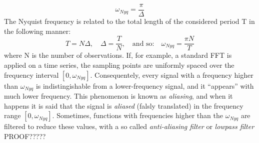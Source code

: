 \documentclass{article}
\begin{document}
\begin{equation}
\omega_{Nyq}=\frac{\pi}{\Delta}
\end{equation}
The Nyquist frequency is related to the total length of the considered period T in the following manner:
\begin{equation}
T=N\Delta, \quad \Delta=\frac{T}{N}, \quad \text{and so:} \quad \omega_{Nyq}=\frac{\pi N}{T}
\end{equation}
where N is the number of observations. If, for example, a standard FFT is applied on a time series, the sampling points are uniformly spaced over the frequency interval $[0,\omega_{Nyq}]$. Consequentely, every signal with a frequency higher than $\omega_{Nyq}$ is indistingishable from a lower-frequency signal, and it ``appears'' with much lower frequency. This phenomenon is known as \textit{aliasing}, and when it happens it is said that the signal is \textit{aliased} (falsly translated) in the frequency range $[0,\omega_{Nyq}]$. Sometimes, functions with frequencies higher than the $\omega_{Nyq}$ are filtered to reduce these values, with a so called \textit{anti-aliasing filter} or \textit{lowpass filter}\\
PROOF?????
\end{document}
